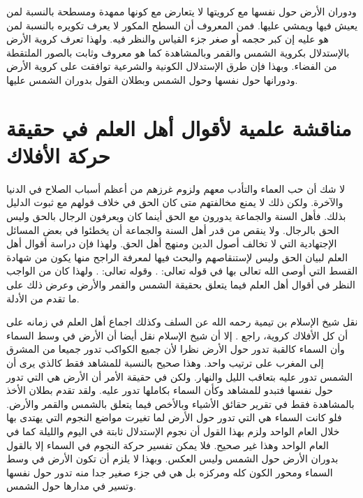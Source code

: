ودوران الأرض حول نفسها مع كرويتها لا يتعارض مع كونها ممهدة ومسطحة بالنسبة لمن يعيش فيها ويمشي عليها. فمن المعروف أن السطح المكور لا يعرف تكويره بالنسبة لمن هو عليه إن كبر حجمه أو صغر جزء القياس والنظر فيه. ولهذا تعرف كروية الأرض بالإستدلال بكروية الشمس والقمر وبالمشاهدة كما هو معروف وثابت بالصور الملتقطة من الفضاء. وبهذا فإن طرق الإستدلال الكونية والشرعية توافقت على كروية الأرض ودورانها حول نفسها وحول الشمس وبطلان القول بدوران الشمس عليها.

\section{مناقشة علمية لأقوال أهل العلم في حقيقة حركة الأفلاك}

لا شك أن حب العماء والتأدب معهم ولزوم غرزهم من أعظم أسباب الصلاح في الدنيا والآخرة. ولكن ذلك لا يمنع مخالفتهم متى كان الحق في خلاف قولهم مع ثبوت الدليل بذلك. فأهل السنة والجماعة يدورون مع الحق أينما كان ويعرفون الرجال بالحق وليس الحق بالرجال. ولا ينقص من قدر أهل السنة والجماعة أن يخطئوا في بعض المسائل الإجتهادية التي لا تخالف أصول الدين ومنهج أهل الحق. ولهذا فإن دراسة أقوال أهل العلم لبيان الحق وليس لإستنقاصهم والبحث فيها لمعرفة الراجح منها يكون من شهادة القسط التي أوصى الله تعالى بها في قوله تعالى: 
\quranayah*[4][135]{\footnotesize (\surahname*[4])}. وقوله تعالى: \quranayah*[5][8]{\footnotesize (\surahname*[5])}. ولهذا كان من الواجب النظر في أقوال أهل العلم فيما يتعلق بحقيقة الشمس والقمر والأرض وعرض ذلك على ما تقدم من الأدلة.

نقل شيخ الإسلام بن تيمية رحمه الله عن السلف وكذلك اجماع أهل العلم في زمانه على أن كل الأفلاك كروية، راجع . إلا أن شيخ الإسلام نقل أيضا أن الأرض في وسط السماء وأن السماء كالقبة تدور حول الأرض نظرا لأن جميع الكواكب تدور جميعا من المشرق إلى المغرب على ترتيب واحد. وهذا صحيح بالنسبة للمشاهد فقط كالذي يرى أن الشمس تدور عليه بتعاقب الليل والنهار. ولكن في حقيقة الأمر أن الأرض هي التي تدور حول نفسها فتبدو للمشاهد وكأن السماء بكاملها تدور عليه. ولقد تقدم بطلان الأخذ بالمشاهدة فقط في تقرير حقائق الأشياء وبالأخص فيما يتعلق بالشمس والقمر والأرض. فلو كانت السماء هي التي تدور حول الأرض لما تغيرت مواضع النجوم التي يهتدى بها خلال العام الواحد ولزم بهذا القول أن نجوم الإستدلال ثابتة في اليوم والليلة كما في العام الواحد وهذا غير صحيح. فلا يمكن تفسير حركة النجوم في السماء إلا بالقول بدوران الأرض حول الشمس وليس العكس. وبهذا لا يلزم أن تكون الأرض في وسط السماء ومحور الكون كله ومركزه بل هي في جزء صغير جدا منه تدور حول نفسها وتسير في مدارها حول الشمس.

